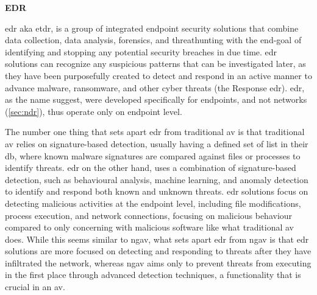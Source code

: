\begin{multicols}{2}
      \textbf{EDR}

      \acrshort{edr} \acrshort{aka} \acrshort{etdr}, is a group of integrated endpoint security solutions that combine data collection,
      data analysis, forensics, and \gls{threathunting} with the end-goal of identifying and stopping any potential security breaches in due
      time. \acrshort{edr} solutions can recognize any suspicious patterns that can be investigated later, as they have been
      purposefully created to detect and respond in an active manner to advance malware, ransomware, and other cyber threats (the Response
      \acrshort{edr}). \acrshort{edr}, as the name suggest, were developed specifically for endpoints, and not networks (\ref{sec:ndr}), thus
      operate only on endpoint level.

      The number one thing that sets apart \acrshort{edr} from traditional \acrshort{av} is that traditional \acrshort{av} relies on
      signature-based detection, usually having a defined set of list in their \acrshort{db}, where known malware signatures are compared
      against files or processes to identify threats. \acrshort{edr} on the other hand, uses a combination of signature-based detection, such
      as behavioural analysis, machine learning, and anomaly detection to identify and respond both known and unknown threats. \acrshort{edr}
      solutions focus on detecting malicious activities at the endpoint level, including file modifications, process execution, and network
      connections, focusing on malicious behaviour compared to only concerning with malicious software like what traditional \acrshort{av} does.
      While this seems similar to \acrshort{ngav}, what sets apart \acrshort{edr} from \acrshort{ngav} is that \acrshort{edr} solutions are
      more focused on detecting and responding to threats after they have infiltrated the network, whereas \acrshort{ngav} aims only to
      prevent threats from executing in the first place through advanced detection techniques, a functionality that is crucial in an \acrshort{av}.




\end{multicols}
